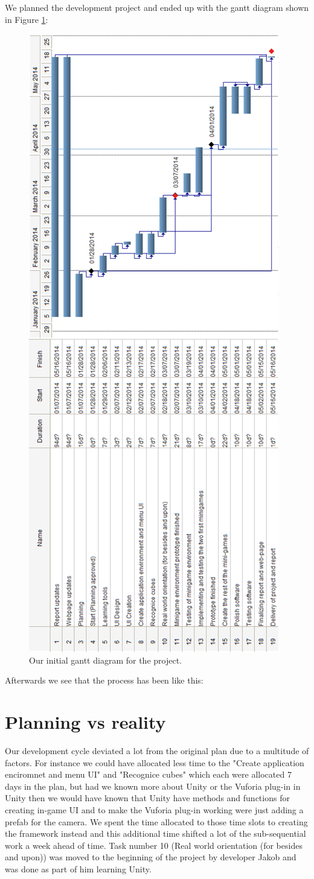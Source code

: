 We planned the development project and ended up with the gantt diagram shown in Figure \ref{fig:preplan_gantt}:

\begin{figure}[h]
	\label{fig:preplan_gantt}
	\centering
	\includegraphics[height=\textwidth, angle=270]{preplan_gantt_diagram}
	\caption[Preplan Gantt diagram]{Our initial gantt diagram for the project.}
\end{figure}


Afterwards we see that the process has been like this:


\section{Planning vs reality}%
Our development cycle deviated a lot from the original plan due to a multitude of factors.
For instance we could have allocated less time to the "Create application enciromnet and menu UI" and "Recognice cubes" which each were allocated 7 days in the plan, but had we known more about Unity or the Vuforia plug-in in Unity then we would have known that Unity have methods and functions for creating in-game UI and to make the Vuforia plug-in working were just adding a \gls{prefab} for the camera.
We spent the time allocated to those time slots to creating the framework instead and this additional time shifted a lot of the sub-sequential work a week ahead of time.
Task number 10 (Real world orientation (for besides and upon)) was moved to the beginning of the project by developer Jakob and was done as part of him learning Unity.

